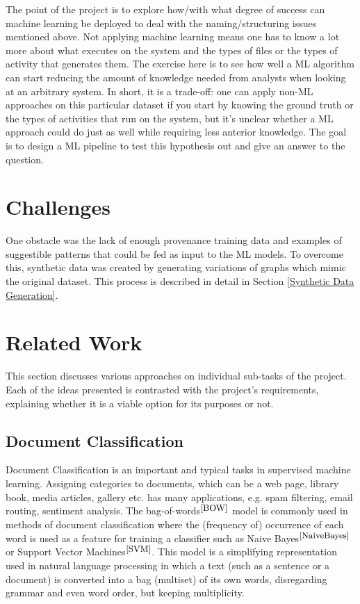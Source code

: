 The point of the project is to explore how/with what degree of success can machine learning be deployed to deal with the naming/structuring issues mentioned above. Not applying machine learning means one has to know a lot more about what executes on the system and the types of files or the types of activity that generates them. The exercise here is to see how well a ML algorithm can start reducing the amount of knowledge needed from analysts when looking at an arbitrary system. In short, it is a trade-off: one can apply non-ML approaches on this particular dataset if you start by knowing the ground truth or the types of activities that run on the system, but it's unclear whether a ML approach could do just as well while requiring less anterior knowledge. The goal is to design a ML pipeline to test this hypothesis out and give an answer to the question. \\

\section{Challenges}

One obstacle was the lack of enough provenance training data and examples of suggestible patterns that could be fed as input to the ML models. To overcome this, synthetic data was created by generating variations of graphs which mimic the original dataset. This process is described in detail in Section \ref{Synthetic Data Generation}.

\section{Related Work}

This section discusses various approaches on individual sub-tasks of the project. Each of the ideas presented is contrasted with the project's requirements, explaining whether it is a viable option for its purposes or not. \\

\subsection{Document Classification}

Document Classification is an important and typical tasks in supervised machine learning. Assigning categories to documents, which can be a web page, library book, media articles, gallery etc. has many applications, e.g. spam filtering, email routing, sentiment analysis. The bag-of-words$^{\small \cite{BOW}}$ model is commonly used in methods of document classification where the (frequency of) occurrence of each word is used as a feature for training a classifier such as Naive Bayes$^{\small \cite{NaiveBayes}}$ or Support Vector Machines$^{\small \cite{SVM}}$. This model is a simplifying representation used in natural language processing in which a text (such as a sentence or a document) is converted into a bag (multiset) of its own words, disregarding grammar and even word order, but keeping multiplicity. \\

